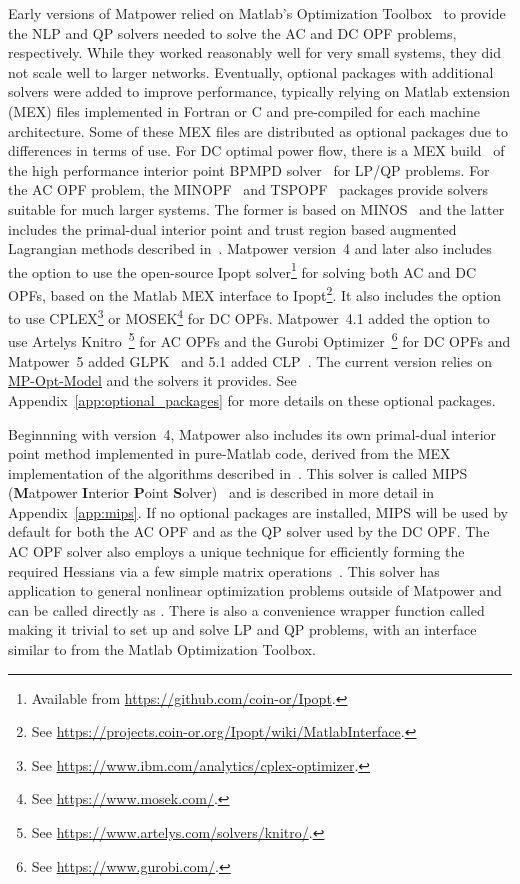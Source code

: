 \documentclass[12pt]{article}
\newcommand{\matlab}[0]{{\sc Matlab}}
\newcommand{\matpower}[0]{{\sc Matpower}}
\newcommand{\mips}[0]{{MIPS}}
\newcommand{\mipsname}[0]{{{\bf M}{\sc atpower} \textbf{I}nterior \textbf{P}oint \textbf{S}olver}}
\newcommand{\mpom}[0]{\mbox{MP-Opt-Model}}
\newcommand{\mpomurl}[0]{https://github.com/MATPOWER/mp-opt-model}
\newcommand{\mpomlink}[0]{\href{\mpomurl}{\mpom{}}}
\newcommand{\ipopt}[0]{{\sc Ipopt}}
\newcommand{\knitro}[0]{{Artelys Knitro}}
\newcommand{\clp}[0]{{CLP}}
\newcommand{\cplex}[0]{{CPLEX}}
\newcommand{\glpk}[0]{{GLPK}}
\newcommand{\gurobi}[0]{{Gurobi}}
\newcommand{\mosek}[0]{{MOSEK}}
\newcommand{\ot}[0]{{Optimization Toolbox}}
\newcommand{\code}[1]{{\relsize{-0.5}{\tt{{#1}}}}}  %
\numberwithin{equation}{section}
\numberwithin{table}{section}
\numberwithin{figure}{section}
\begin{document}
Early versions of \matpower{} relied on \matlab{}'s \ot{}~\cite{ot} to provide the NLP and QP solvers needed to solve the AC and DC OPF problems, respectively. While they worked reasonably well for very small systems, they did not scale well to larger networks. Eventually, optional packages with additional solvers were added to improve performance, typically relying on \matlab{} extension (MEX) files implemented in Fortran or C and pre-compiled for each machine architecture. Some of these MEX files are distributed as optional packages due to differences in terms of use. For DC optimal power flow, there is a MEX build~\cite{bpmpdmex} of the high performance interior point BPMPD solver~\cite{meszaros1996} for LP/QP problems. For the AC OPF problem, the MINOPF~\cite{minopf} and TSPOPF~\cite{tspopf} packages provide solvers suitable for much larger systems. The former is based on MINOS~\cite{murtagh} and the latter includes the primal-dual interior point and trust region based augmented Lagrangian methods described in~\cite{wang2007a}. \matpower{} version~4 and later also includes the option to use the open-source \ipopt{} solver\footnote{Available from \url{https://github.com/coin-or/Ipopt}.} for solving both AC and DC OPFs, based on the \matlab{} MEX interface to \ipopt{}\footnote{See \url{https://projects.coin-or.org/Ipopt/wiki/MatlabInterface}.}. It also includes the option to use \cplex{}\footnote{See \url{https://www.ibm.com/analytics/cplex-optimizer}.} or \mosek{}\footnote{See \url{https://www.mosek.com/}.} for DC OPFs. \matpower{}~4.1 added the option to use \knitro{}~\cite{knitro}\footnote{See \url{https://www.artelys.com/solvers/knitro/}.} for AC OPFs and the \gurobi{} Optimizer~\cite{gurobi}\footnote{See \url{https://www.gurobi.com/}.} for DC OPFs and \matpower{}~5 added \glpk{}~\cite{glpk} and 5.1 added \clp{}~\cite{clp}. The current version relies on \mpomlink{} and the solvers it provides. See Appendix~\ref{app:optional_packages} for more details on these optional packages.

Beginnning with version~4, \matpower{} also includes its own primal-dual interior point method implemented in pure-\matlab{} code, derived from the MEX implementation of the algorithms described in~\cite{wang2007a}. This solver is called \mips{} (\mipsname{})~\cite{mips} and is described in more detail in Appendix~\ref{app:mips}. If no optional packages are installed, \mips{} will be used by default for both the AC OPF and as the QP solver used by the DC OPF. The AC OPF solver also employs a unique technique for efficiently forming the required Hessians via a few simple matrix operations~\cite{zimmerman2010b, sereeter2018a, sereeter2018b}. This solver has application to general nonlinear optimization problems outside of \matpower{} and can be called directly as \code{mips}. There is also a convenience wrapper function called \code{qps\_mips} making it trivial to set up and solve LP and QP problems, with an interface similar to \code{quadprog} from the \matlab{} \ot{}.
\end{document}
